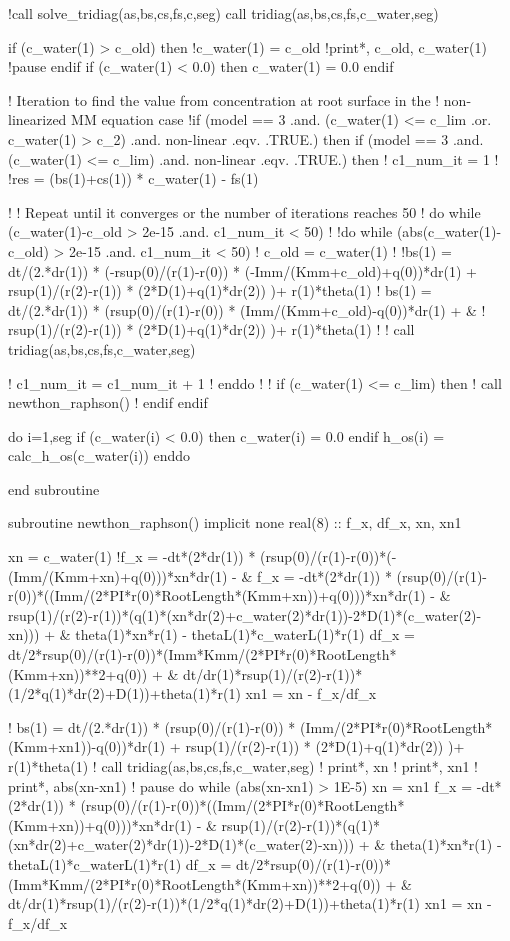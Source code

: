   !call solve_tridiag(as,bs,cs,fs,c,seg)
  call tridiag(as,bs,cs,fs,c_water,seg)
  
  if (c_water(1) > c_old) then
    !c_water(1) = c_old
    !print*, c_old, c_water(1)
    !pause
  endif
  if (c_water(1) < 0.0) then
    c_water(1) = 0.0
  endif

  ! Iteration to find the value from concentration at root surface in the
  ! non-linearized MM equation case
  !if (model == 3 .and. (c_water(1) <= c_lim .or. c_water(1) > c_2) .and. non-linear .eqv. .TRUE.) then
  if (model == 3 .and. (c_water(1) <= c_lim) .and. non-linear .eqv. .TRUE.) then
  !  c1_num_it = 1
  !  !res = (bs(1)+cs(1)) * c_water(1) - fs(1)

  !  ! Repeat until it converges or the number of iterations reaches 50
  !  do while (c_water(1)-c_old > 2e-15 .and. c1_num_it < 50) 
  !  !do while (abs(c_water(1)-c_old) > 2e-15 .and. c1_num_it < 50) 
  !    c_old = c_water(1)
  !    !bs(1) = dt/(2.*dr(1)) * (-rsup(0)/(r(1)-r(0)) * (-Imm/(Kmm+c_old)+q(0))*dr(1) + rsup(1)/(r(2)-r(1)) * (2*D(1)+q(1)*dr(2)) )+ r(1)*theta(1)
  !    bs(1) = dt/(2.*dr(1)) * (rsup(0)/(r(1)-r(0)) * (Imm/(Kmm+c_old)-q(0))*dr(1) + &
  !            rsup(1)/(r(2)-r(1)) * (2*D(1)+q(1)*dr(2)) )+ r(1)*theta(1) 
  !    
  !    call tridiag(as,bs,cs,fs,c_water,seg)

  !    c1_num_it = c1_num_it + 1
  !  enddo
  ! 
  ! if (c_water(1) <= c_lim) then 
  !   call newthon_raphson()
  ! endif
  endif
  
  do i=1,seg
    if (c_water(i) < 0.0) then
      c_water(i) = 0.0
    endif
    h_os(i) = calc_h_os(c_water(i))
  enddo

end subroutine

subroutine newthon_raphson()
implicit none
  real(8) :: f_x, df_x, xn, xn1

  xn = c_water(1)
  !f_x = -dt*(2*dr(1)) * (rsup(0)/(r(1)-r(0))*(-(Imm/(Kmm+xn)+q(0)))*xn*dr(1) - &
  f_x = -dt*(2*dr(1)) * (rsup(0)/(r(1)-r(0))*((Imm/(2*PI*r(0)*RootLength*(Kmm+xn))+q(0)))*xn*dr(1) - &
    rsup(1)/(r(2)-r(1))*(q(1)*(xn*dr(2)+c_water(2)*dr(1))-2*D(1)*(c_water(2)-xn))) + &
    theta(1)*xn*r(1) - thetaL(1)*c_waterL(1)*r(1)
  df_x = dt/2*rsup(0)/(r(1)-r(0))*(Imm*Kmm/(2*PI*r(0)*RootLength*(Kmm+xn))**2+q(0)) + &
    dt/dr(1)*rsup(1)/(r(2)-r(1))*(1/2*q(1)*dr(2)+D(1))+theta(1)*r(1)
  xn1 = xn - f_x/df_x

!  bs(1) = dt/(2.*dr(1)) * (rsup(0)/(r(1)-r(0)) * (Imm/(2*PI*r(0)*RootLength*(Kmm+xn1))-q(0))*dr(1) + rsup(1)/(r(2)-r(1)) * (2*D(1)+q(1)*dr(2)) )+ r(1)*theta(1) 
!  call tridiag(as,bs,cs,fs,c_water,seg)
!  print*, xn
!  print*, xn1
!  print*, abs(xn-xn1)
!  pause
  do while (abs(xn-xn1) > 1E-5)
    xn = xn1
    f_x = -dt*(2*dr(1)) * (rsup(0)/(r(1)-r(0))*((Imm/(2*PI*r(0)*RootLength*(Kmm+xn))+q(0)))*xn*dr(1) - &
      rsup(1)/(r(2)-r(1))*(q(1)*(xn*dr(2)+c_water(2)*dr(1))-2*D(1)*(c_water(2)-xn))) + &
      theta(1)*xn*r(1) - thetaL(1)*c_waterL(1)*r(1)
    df_x = dt/2*rsup(0)/(r(1)-r(0))*(Imm*Kmm/(2*PI*r(0)*RootLength*(Kmm+xn))**2+q(0)) + &
      dt/dr(1)*rsup(1)/(r(2)-r(1))*(1/2*q(1)*dr(2)+D(1))+theta(1)*r(1)
    xn1 = xn - f_x/df_x
    
